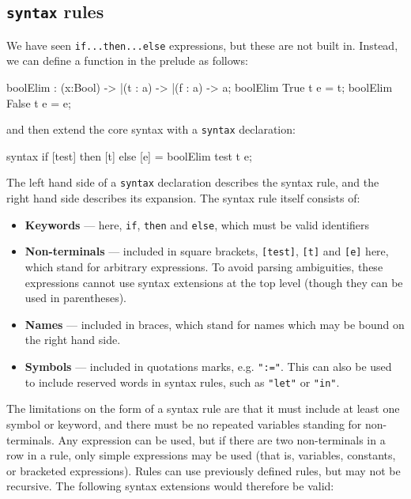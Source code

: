 \subsection{\texttt{syntax} rules}

We have seen \texttt{if...then...else} expressions, but these are not built in.
Instead, we can define a function in the prelude as follows:

\begin{code}
boolElim : (x:Bool) -> |(t : a) -> |(f : a) -> a; 
boolElim True  t e = t;
boolElim False t e = e;
\end{code}

\noindent
and then extend the core syntax with a \texttt{syntax} declaration:

\begin{code}
syntax if [test] then [t] else [e] = boolElim test t e;
\end{code}

\noindent
The left hand side of a \texttt{syntax} declaration describes the syntax rule, and the right hand side describes its expansion.
The syntax rule itself consists of:

\begin{itemize}
\item \textbf{Keywords} --- here, \texttt{if}, \texttt{then} and \texttt{else}, which must be valid identifiers
\item \textbf{Non-terminals} --- included in square brackets, \texttt{[test]}, \texttt{[t]} and \texttt{[e]} here, which stand for arbitrary expressions.
To avoid parsing ambiguities, these expressions cannot use syntax extensions at the top level (though they can be used in parentheses).
\item \textbf{Names} --- included in braces, which stand for names which may be bound on the right hand side.
\item \textbf{Symbols} --- included in quotations marks, e.g. \texttt{":="}.
This can also be used to include reserved words in syntax rules, such as \texttt{"let"} or \texttt{"in"}.
\end{itemize}

\noindent
The limitations on the form of a syntax rule are that it must include at least one symbol or keyword, and there must be no repeated variables standing for non-terminals.
Any expression can be used, but if there are two non-terminals in a row in a rule, only simple expressions may be used (that is, variables, constants, or bracketed expressions).
Rules can use previously defined rules, but may not be recursive.
The following syntax extensions would therefore be valid:

